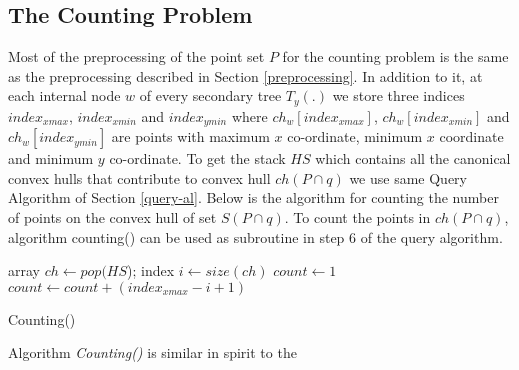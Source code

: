 \documentclass[runningheads,a4paper]{llncs}
\begin{document}
\subsection{The Counting Problem}\label{Count}
Most of the preprocessing of the point set $P$ for the counting problem is the
same as the preprocessing described in Section \ref{preprocessing}. In
addition to it, at each internal node $w$ of every secondary tree $T_{y}(.)$
we store three indices $index_{xmax}$, $index_{xmin}$ and $index_{ymin}$ where
$ch_{w}[index_{xmax}]$, $ch_{w}[index_{xmin}]$ and $ch_{w}[index_{ymin}]$ are
points with maximum $x$ co-ordinate, minimum $x$ coordinate and minimum $y$
co-ordinate.  To get the stack $HS$ which contains all the canonical convex
hulls that contribute to convex hull $ch(P\cap q)$ we use same Query Algorithm
of Section \ref{query-al}. Below is the algorithm for counting the number of
points on the convex hull of set $S(P \cap q)$. To count the points in $ch(P \cap q)$, 
algorithm counting() can be used as subroutine in step 6 of the query algorithm.
\begin{algorithm}
    array $ch \leftarrow pop(HS$);
    index $i \leftarrow size(ch)$\;
    $count \leftarrow 1$\;
     $count \leftarrow count + (index_{xmax} - i + 1)$\;
 \caption{Counting()}
\end{algorithm}
\vspace{-0.7cm}
Algorithm \emph{Counting()} is similar in spirit to the
\end{document}
